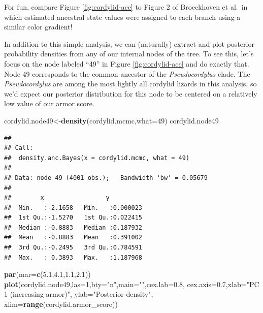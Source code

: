 \documentclass[fleqn,10pt,lineno]{wlpeerj} %
\newenvironment{Shaded}{\begin{snugshade}}{\end{snugshade}}
\newcommand{\AttributeTok}[1]{\textcolor[rgb]{0.13,0.29,0.53}{#1}}
\newcommand{\DecValTok}[1]{\textcolor[rgb]{0.00,0.00,0.81}{#1}}
\newcommand{\FloatTok}[1]{\textcolor[rgb]{0.00,0.00,0.81}{#1}}
\newcommand{\FunctionTok}[1]{\textcolor[rgb]{0.13,0.29,0.53}{\textbf{#1}}}
\newcommand{\NormalTok}[1]{#1}
\newcommand{\OtherTok}[1]{\textcolor[rgb]{0.56,0.35,0.01}{#1}}
\newcommand{\StringTok}[1]{\textcolor[rgb]{0.31,0.60,0.02}{#1}}
\begin{document}
For fun, compare Figure \ref{fig:cordylid-ace} to Figure 2 of Broeckhoven et al.~in which estimated ancestral state values were assigned to each branch using a similar color gradient!

In addition to this simple analysis, we can (naturally) extract and plot posterior probability densities from any of our internal nodes of the tree. To see this, let's focus on the node labeled ``49'' in Figure \ref{fig:cordylid-ace} and do exactly that. Node 49 corresponds to the common ancestor of the \emph{Pseudocordylus} clade. The \emph{Pseudocordylus} are among the most lightly all cordylid lizards in this analysis, so we'd expect our posterior distribution for this node to be centered on a relatively low value of our armor score.

\begin{Shaded}
\begin{Highlighting}[]
\NormalTok{cordylid.node49}\OtherTok{\textless{}{-}}\FunctionTok{density}\NormalTok{(cordylid.mcmc,}\AttributeTok{what=}\DecValTok{49}\NormalTok{)}
\NormalTok{cordylid.node49}
\end{Highlighting}
\end{Shaded}

\begin{verbatim}
## 
## Call:
##  density.anc.Bayes(x = cordylid.mcmc, what = 49)
## 
## Data: node 49 (4001 obs.);   Bandwidth 'bw' = 0.05679
## 
##        x                 y           
##  Min.   :-2.1658   Min.   :0.000023  
##  1st Qu.:-1.5270   1st Qu.:0.022415  
##  Median :-0.8883   Median :0.187932  
##  Mean   :-0.8883   Mean   :0.391002  
##  3rd Qu.:-0.2495   3rd Qu.:0.784591  
##  Max.   : 0.3893   Max.   :1.187968
\end{verbatim}

\begin{Shaded}
\begin{Highlighting}[]
\FunctionTok{par}\NormalTok{(}\AttributeTok{mar=}\FunctionTok{c}\NormalTok{(}\FloatTok{5.1}\NormalTok{,}\FloatTok{4.1}\NormalTok{,}\FloatTok{1.1}\NormalTok{,}\FloatTok{2.1}\NormalTok{))}
\FunctionTok{plot}\NormalTok{(cordylid.node49,}\AttributeTok{las=}\DecValTok{1}\NormalTok{,}\AttributeTok{bty=}\StringTok{"n"}\NormalTok{,}\AttributeTok{main=}\StringTok{""}\NormalTok{,}\AttributeTok{cex.lab=}\FloatTok{0.8}\NormalTok{,}
  \AttributeTok{cex.axis=}\FloatTok{0.7}\NormalTok{,}\AttributeTok{xlab=}\StringTok{"PC 1 (increasing armor)"}\NormalTok{,}
  \AttributeTok{ylab=}\StringTok{"Posterior density"}\NormalTok{,}
  \AttributeTok{xlim=}\FunctionTok{range}\NormalTok{(cordylid.armor\_score))}
\end{Highlighting}
\end{Shaded}
\end{document}
